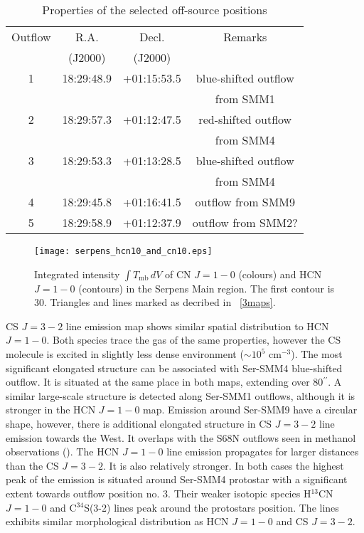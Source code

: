 \documentclass{aa}
\begin{document}
\begin{table}
\caption{Properties of the selected off-source positions}             %
\label{table:3}      %
\centering                          %
\begin{tabular}{c c c c} 
\hline\hline 
Outflow & R.A. & Decl. & Remarks\\
 & (J2000) & (J2000) & \\
\hline
1 & 18:29:48.9 & +01:15:53.5 & blue-shifted outflow \\
&&&from SMM1\\
2 & 18:29:57.3 & +01:12:47.5 & red-shifted outflow \\
&&&from SMM4\\
3 & 18:29:53.3 & +01:13:28.5 & blue-shifted outflow\\
&&&from SMM4\\
4 & 18:29:45.8 & +01:16:41.5 & outflow from SMM9 \\
5 & 18:29:58.9 & +01:12:37.9 & outflow from SMM2? \\
\hline
\end{tabular}
\end{table}


\begin{figure}
   \centering
   \texttt{[image: serpens\_hcn10\_and\_cn10.eps]}
      \caption{Integrated intensity $\int T_\mathrm{mb}\, dV$ of CN $J=1-0$ (colours) and HCN $J=1-0$ (contours) in the Serpens Main region. The first contour is 30. Triangles and lines marked as decribed in ~\ref{3maps}.}
         \label{cn10_and_hcn10}
   \end{figure}

CS $J=3-2$ line emission map shows similar spatial distribution to HCN $J=1-0$. Both species trace the gas of the same properties, however the CS molecule is excited in slightly less dense environment ($\sim 10^5$ cm$^{-3}$). The most significant elongated structure can be associated with Ser-SMM4 blue-shifted outflow. It is situated at the same place in both maps, extending over 80$^{\prime\prime}$. A similar large-scale structure is detected along Ser-SMM1 outflows, although it is stronger in the HCN $J=1-0$ map. Emission around Ser-SMM9 have a circular shape, however, there is additional elongated structure in CS $J=3-2$ line emission towards the West. It overlaps with the S68N outflows seen in methanol observations (\citealt{Kri10}). The HCN $J=1-0$  line emission propagates for larger distances than the CS $J=3-2$. It is also relatively stronger. In both cases the highest peak of the emission is situated around Ser-SMM4 protostar with a significant extent towards outflow position no. 3. Their weaker isotopic species H$^{13}$CN $J=1-0$ and \mbox{C$^{34}$S(3-2)} lines peak around the protostars position. The lines exhibits similar morphological distribution as HCN $J=1-0$ and CS $J=3-2$.
\end{document}
